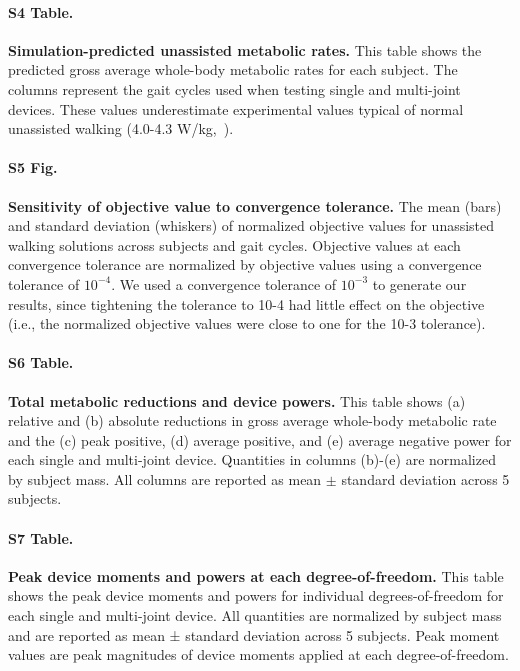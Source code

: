 \documentclass[10pt,letterpaper]{article}
\begin{document}
\paragraph*{S4 Table.}
\label{S4_Table}
{\bf Simulation-predicted unassisted metabolic rates.} This table shows the predicted gross average whole-body metabolic rates for each subject. The columns represent the gait cycles used when testing single and multi-joint devices. These values underestimate experimental values typical of normal unassisted walking (4.0-4.3 W/kg,~\cite{Waters:1999}).

\paragraph*{S5 Fig.}
\label{S5_Fig}
{\bf Sensitivity of objective value to convergence tolerance.} The mean (bars) and standard deviation (whiskers) of normalized objective values for unassisted walking solutions across subjects and gait cycles. Objective values at each convergence tolerance are normalized by objective values using a convergence tolerance of $10^{-4}$. We used a convergence tolerance of $10^{-3}$ to generate our results, since tightening the tolerance to 10-4 had little effect on the objective (i.e., the normalized objective values were close to one for the 10-3 tolerance).

\paragraph*{S6 Table.}
\label{S6_Table}
{\bf Total metabolic reductions and device powers.} This table shows (a) relative and (b) absolute reductions in gross average whole-body metabolic rate and the (c) peak positive, (d) average positive, and (e) average negative power for each single and multi-joint device. Quantities in columns (b)-(e) are normalized by subject mass. All columns are reported as mean $\pm$ standard deviation across 5 subjects.

\paragraph*{S7 Table.}
\label{S7_Table}
{\bf Peak device moments and powers at each degree-of-freedom.} This table shows the peak device moments and powers for individual degrees-of-freedom for each single and multi-joint device. All quantities are normalized by subject mass and are reported as mean ± standard deviation across 5 subjects. Peak moment values are peak magnitudes of device moments applied at each degree-of-freedom.
\end{document}
